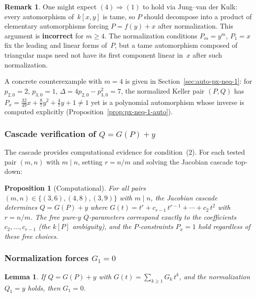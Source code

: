 \documentclass[12pt,a4paper]{article}
\newtheorem{proposition}[theorem]{Proposition}
\newtheorem{lemma}[theorem]{Lemma}
\theoremstyle{definition}
\newtheorem{remark}[theorem]{Remark}
\newcommand{\kk}{k}
\begin{document}
\begin{remark}\label{rem:4-not-imply-1}
One might expect $(4) \Rightarrow (1)$ to hold via Jung--van der
Kulk: every automorphism of~$\kk[x,y]$ is tame, so $P$ should
decompose into a product of elementary automorphisms forcing
$P = f(y) + x$ after normalization. This argument is \textbf{incorrect}
for $m \geq 4$. The normalization conditions $P_m = y^m$, $P_1 = x$
fix the leading and linear forms of~$P$, but a tame automorphism
composed of triangular maps need not have its first component
linear in~$x$ after such normalization.

A concrete counterexample with $m = 4$ is given in
Section~\ref{sec:auto-px-neq-1}: for $p_{2,0} = 2$, $p_{3,0} = 1$,
$\Delta = 4p_{2,0} - p_{3,0}^2 = 7$, the normalized Keller pair
$(P,Q)$ has $P_x = \tfrac{32}{49}x + \tfrac{8}{7}y^2 + \tfrac{4}{7}y + 1
\neq 1$ yet is a polynomial automorphism whose inverse is computed
explicitly (Proposition~\ref{prop:px-neq-1-auto}).
\end{remark}

\subsubsection*{Cascade verification of $Q = G(P) + y$}

The cascade provides computational evidence for condition~(2).
For each tested pair $(m,n)$ with $m \mid n$, setting $r = n/m$
and solving the Jacobian cascade top-down:

\begin{proposition}[Computational]\label{prop:gpy-comp}
For all pairs $(m,n) \in \{(3,6), (4,8), (3,9)\}$ with $m \mid n$,
the Jacobian cascade determines $Q = G(P) + y$ where
$G(t) = t^r + c_{r-1}\,t^{r-1} + \cdots + c_2\,t^2$ with $r = n/m$.
The free pure-$y$ $Q$-parameters correspond exactly to the
coefficients $c_2, \ldots, c_{r-1}$ (the $\kk[P]$ ambiguity), and the
$P$-constraints $P_x = 1$ hold regardless of these free choices.
\end{proposition}

\subsubsection*{Normalization forces $G_1 = 0$}

\begin{lemma}\label{lem:G1}
If $Q = G(P) + y$ with $G(t) = \sum_{k \geq 1} G_k\, t^k$, and the
normalization $Q_1 = y$ holds, then $G_1 = 0$.
\end{lemma}
\end{document}
